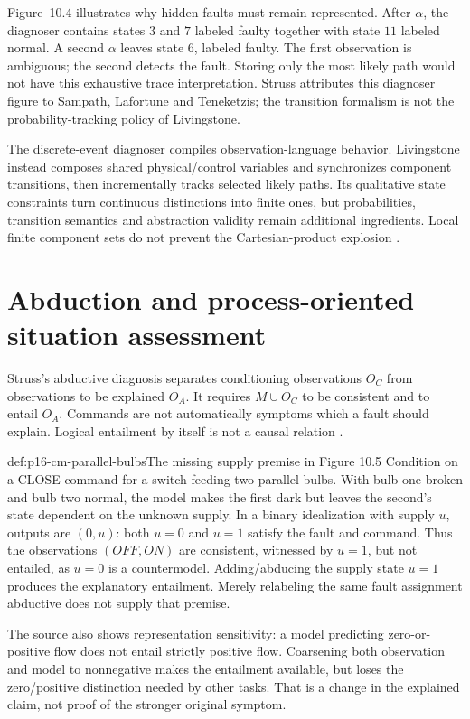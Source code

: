 Figure~10.4 illustrates why hidden faults must remain represented. After
\(\alpha\), the diagnoser contains states \(3\) and \(7\) labeled
faulty together with state \(11\) labeled normal. A second \(\alpha\)
leaves state \(6\), labeled faulty. The first observation is ambiguous;
the second detects the fault. Storing only the most likely path would not
have this exhaustive trace interpretation. Struss attributes this diagnoser
figure to Sampath, Lafortune and Teneketzis; the transition formalism is not
the probability-tracking policy of Livingstone.

The discrete-event diagnoser compiles observation-language behavior.
Livingstone instead composes shared physical/control variables and synchronizes
component transitions, then incrementally tracks selected likely paths.
Its qualitative state constraints turn continuous distinctions into finite
ones, but probabilities, transition semantics and abstraction validity remain
additional ingredients. Local finite component sets do not prevent the
Cartesian-product explosion \cite[pp.~428--431]{Struss2008ModelBasedProblemSolving}.

\section{Abduction and process-oriented situation assessment}
\label{sec:p16-cm-process-assessment}

Struss's abductive diagnosis separates conditioning observations \(O_C\)
from observations to be explained \(O_A\). It requires
\(M\cup O_C\) to be consistent and to entail \(O_A\).
Commands are not automatically symptoms which a fault should explain.
Logical entailment by itself is not a causal relation
\cite[sec.~10.4.5]{Struss2008ModelBasedProblemSolving}.

\begin{hbexample}{def:p16-cm-parallel-bulbs}{The missing supply premise in Figure 10.5}
Condition on a CLOSE command for a switch feeding two parallel bulbs.
With bulb one broken and bulb two normal, the model makes the first dark
but leaves the second's state dependent on the unknown supply. In a binary
idealization with supply \(u\), outputs are \((0,u)\): both \(u=0\)
and \(u=1\) satisfy the fault and command. Thus the observations
\((OFF,ON)\) are consistent, witnessed by \(u=1\), but not entailed,
as \(u=0\) is a countermodel. Adding/abducing the supply state \(u=1\)
produces the explanatory entailment. Merely relabeling the same fault
assignment abductive does not supply that premise.

The source also shows representation sensitivity: a model predicting
zero-or-positive flow does not entail strictly positive flow. Coarsening both
observation and model to nonnegative makes the entailment available, but
loses the zero/positive distinction needed by other tasks. That is a change
in the explained claim, not proof of the stronger original symptom.
\end{hbexample}

